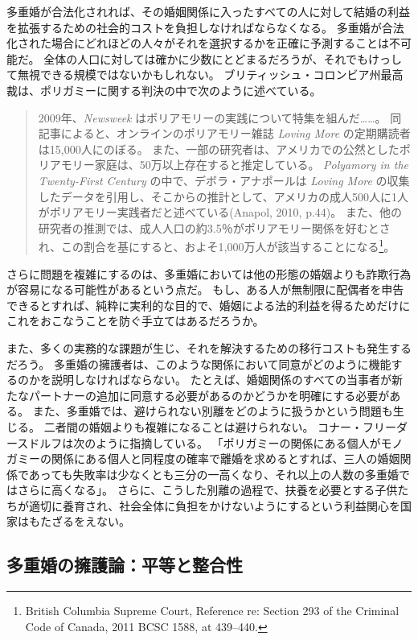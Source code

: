 \documentclass[paper=a4,book,openany]{jlreq}
\begin{document}
多重婚が合法化されれば、その婚姻関係に入ったすべての人に対して結婚の利益を拡張するための社会的コストを負担しなければならなくなる。
多重婚が合法化された場合にどれほどの人々がそれを選択するかを正確に予測することは不可能だ。
全体の人口に対しては確かに少数にとどまるだろうが、それでもけっして無視できる規模ではないかもしれない。
ブリティッシュ・コロンビア州最高裁は、ポリガミーに関する判決の中で次のように述べている。

\begin{quote}
2009年、\emph{Newsweek} はポリアモリーの実践について特集を組んだ……。
同記事によると、オンラインのポリアモリー雑誌 \emph{Loving More} の定期購読者は15,000人にのぼる。
また、一部の研究者は、アメリカでの公然としたポリアモリー家庭は、50万以上存在すると推定している。
\emph{Polyamory in the Twenty-First Century} の中で、デボラ・アナポールは \emph{Loving More} の収集したデータを引用し、そこからの推計として、アメリカの成人500人に1人がポリアモリー実践者だと述べている(Anapol, 2010, p.44)。
また、他の研究者の推測では、成人人口の約3.5％がポリアモリー関係を好むとされ、この割合を基にすると、およそ1,000万人が該当することになる\footnote{British Columbia Supreme Court, Reference re: Section 293 of the Criminal Code of Canada, 2011 BCSC 1588, at 439--440.}。
\nocite{anapol10:_polyam_centur}
\end{quote}

さらに問題を複雑にするのは、多重婚においては他の形態の婚姻よりも詐欺行為が容易になる可能性があるという点だ。
もし、ある人が無制限に配偶者を申告できるとすれば、純粋に実利的な目的で、婚姻による法的利益を得るためだけにこれをおこなうことを防ぐ手立てはあるだろうか。

また、多くの実務的な課題が生じ、それを解決するための移行コストも発生するだろう。
多重婚の擁護者は、このような関係において同意がどのように機能するのかを説明しなければならない。
たとえば、婚姻関係のすべての当事者が新たなパートナーの追加に同意する必要があるのかどうかを明確にする必要がある。
また、多重婚では、避けられない別離をどのように扱うかという問題も生じる。
二者間の婚姻よりも複雑になることは避けられない。
コナー・フリーダースドルフは次のように指摘している。
「ポリガミーの関係にある個人がモノガミーの関係にある個人と同程度の確率で離婚を求めるとすれば、三人の婚姻関係であっても失敗率は少なくとも三分の一高くなり、それ以上の人数の多重婚ではさらに高くなる」\citep{friedersdorf15:_case_encour_polyg}。
さらに、こうした別離の過程で、扶養を必要とする子供たちが適切に養育され、社会全体に負担をかけないようにするという利益関心を国家はもたざるをえない。

\subsection{多重婚の擁護論：平等と整合性}
\end{document}
